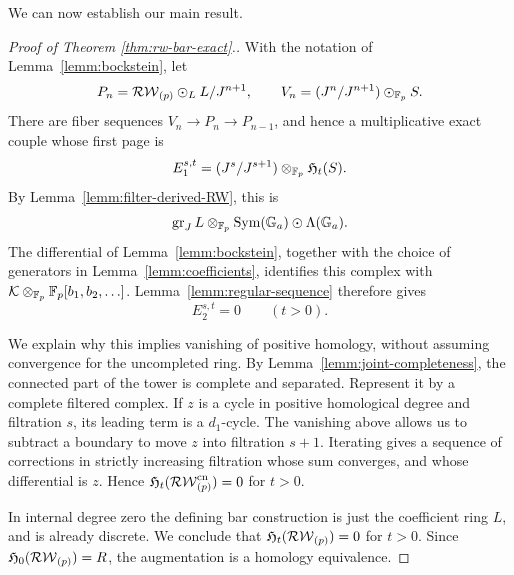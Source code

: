 We can now establish our main result.

\begin{proof}[Proof of Theorem \ref{thm:rw-bar-exact}.]
With the notation of Lemma~\ref{lemm:bockstein}, let
\[P_n=\mathcal{RW}_{(p)}\odot_L L/J^{n+1},\qquad V_n=(J^n/J^{n+1})\odot_{\mathbb{F}_p} S.\]
There are fiber sequences $V_n\to P_n\to P_{n-1}$, and hence a multiplicative exact couple whose first page is
\[E_1^{s,t}= (J^s/J^{s+1})\otimes_{\mathbb{F}_p}\mathfrak H_t(S).\]
By Lemma~\ref{lemm:filter-derived-RW}, this is
\[\operatorname{gr}_J L\otimes_{\mathbb{F}_p}\mathrm{Sym}({\mathbb G}_a)\odot\Lambda({\mathbb G}_a).\]
The differential of Lemma~\ref{lemm:bockstein}, together with the choice of generators in Lemma~\ref{lemm:coefficients}, identifies this complex with $\mathcal K\otimes_{\mathbb{F}_p} \mathbb{F}_p[b_1,b_2,\ldots]$. Lemma~\ref{lemm:regular-sequence} therefore gives
\[E_2^{s,t}=0\qquad(t>0).\]

We explain why this implies vanishing of positive homology, without assuming convergence for the uncompleted ring. By Lemma~\ref{lemm:joint-completeness}, the connected part of the tower is complete and separated. Represent it by a complete filtered complex. If $z$ is a cycle in positive homological degree and filtration $s$, its leading term is a $d_1$-cycle. The vanishing above allows us to subtract a boundary to move $z$ into filtration $s+1$. Iterating gives a sequence of corrections in strictly increasing filtration whose sum converges, and whose differential is $z$. Hence $\mathfrak H_t(\mathcal{RW}_{(p)}^{\mathrm{cn}})=0$ for $t>0$.

In internal degree zero the defining bar construction is just the coefficient ring $L$, and is already discrete. We conclude that $\mathfrak H_t(\mathcal{RW}_{(p)})=0$ for $t>0$. Since $\mathfrak H_0(\mathcal{RW}_{(p)})=R$, the augmentation is a homology equivalence.
\end{proof}
